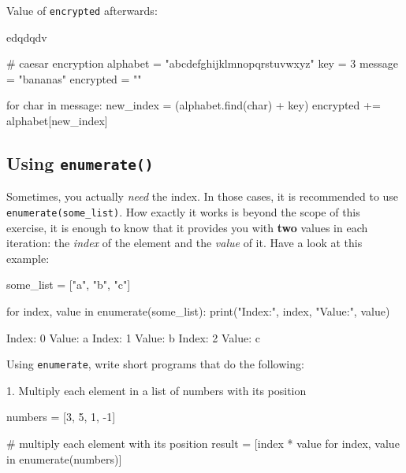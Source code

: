 \noindent Value of \texttt{encrypted} afterwards:

\begin{outputcode}
edqdqdv
\end{outputcode}

\begin{solution}
    \begin{pythoncode}
# caesar encryption
alphabet    = "abcdefghijklmnopqrstuvwxyz"
key         = 3
message     = "bananas"
encrypted   = ""

for char in message:
    new_index = (alphabet.find(char) + key) %
    encrypted += alphabet[new_index]
    \end{pythoncode}
\end{solution}

\subsection{Using \texttt{enumerate()}}

Sometimes, you actually \textit{need} the index. In those cases, it is recommended to use \texttt{enumerate(some\_list)}. How exactly it works is beyond the scope of this exercise, it is enough to know that it provides you with \textbf{two} values in each iteration: the \textit{index} of the element and the \textit{value} of it. Have a look at this example:

\begin{pythoncode}
some_list = ["a", "b", "c"]

for index, value in enumerate(some_list):
        print("Index:", index, "Value:", value)
\end{pythoncode}

\begin{outputcode}
Index: 0 Value: a
Index: 1 Value: b
Index: 2 Value: c
\end{outputcode}

\noindent Using \texttt{enumerate}, write short programs that do the following:

\vspace{1em}

1. Multiply each element in a list of numbers with its position

\vspace{1em}

\begin{solution}
    \begin{pythoncode}
numbers = [3, 5, 1, -1]

# multiply each element with its position
result = [index * value for index, value in enumerate(numbers)]
    \end{pythoncode}
\end{solution}

